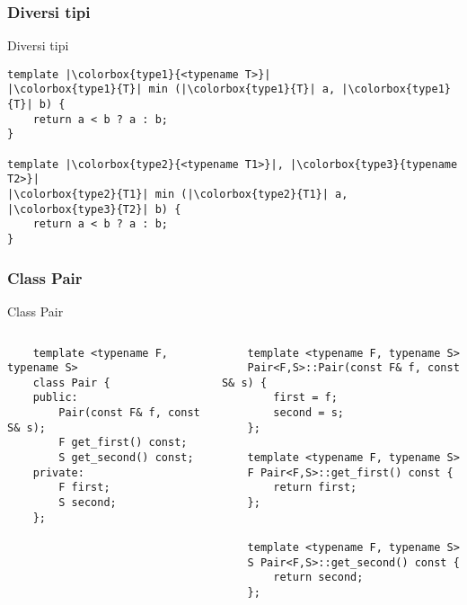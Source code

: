 \documentclass[xcolor={dvipsnames, svgnames, x11names, table}, 10pt]{beamer}
\begin{document}
\begin{frame}[t, fragile]


\end{frame}

\subsubsection*{Diversi tipi}

\setlength{\fboxsep}{2pt}

\begin{frame}[c, fragile]{Diversi tipi}
\begin{verbatim}
template |\colorbox{type1}{<typename T>}|
|\colorbox{type1}{T}| min (|\colorbox{type1}{T}| a, |\colorbox{type1}{T}| b) {
    return a < b ? a : b;
}

template |\colorbox{type2}{<typename T1>}|, |\colorbox{type3}{typename T2>}|
|\colorbox{type2}{T1}| min (|\colorbox{type2}{T1}| a, |\colorbox{type3}{T2}| b) {
    return a < b ? a : b;
}

\end{verbatim}

\end{frame}

\subsubsection*{Class Pair}

\begin{frame}[t, fragile]{Class Pair}

\begin{columns}[t]

    \begin{verbatim}
    template <typename F, typename S>
    class Pair {
    public:
        Pair(const F& f, const S& s);
        F get_first() const;
        S get_second() const;
    private:
        F first;
        S second;
    };
    \end{verbatim}
    
    \begin{verbatim}
    template <typename F, typename S>
    Pair<F,S>::Pair(const F& f, const S& s) {
        first = f;
        second = s;
    };
    
    template <typename F, typename S>
    F Pair<F,S>::get_first() const {
        return first;
    };
    
    
    template <typename F, typename S>
    S Pair<F,S>::get_second() const {
        return second;
    };
    \end{verbatim}

\end{columns}
\end{frame}
\end{document}
